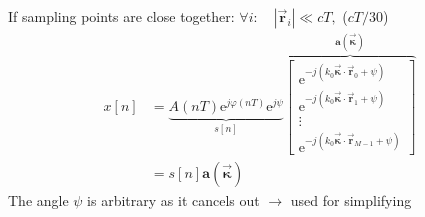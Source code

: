 \documentclass[english]{latex4ei/latex4ei_sheet}
\begin{document}
\begin{sectionbox}
If sampling points are close together: $\forall i: \quad\left|\overrightarrow{\boldsymbol{r}}_{i}\right| \ll c T,$ ($cT/30$)\vspace{-0.1cm}
$$\begin{aligned}x[n]&=\underbrace{A(n T) \mathrm{e}^{j \varphi(n T)} \mathrm{e}^{j \psi}}_{s[n]} \overbrace{\left[\begin{array}{l}
  \mathrm{e}^{-j\left(k_{0} \overrightarrow{\boldsymbol{\kappa}} \cdot \overrightarrow{\boldsymbol{r}}_{0}+\psi\right)} \\
  \mathrm{e}^{-j\left(k_{0} \overrightarrow{\boldsymbol{\kappa}} \cdot \overrightarrow{\boldsymbol{r}}_{1}+\psi\right)} \\
  \vdots \\
  \mathrm{e}^{-j\left(k_{0} \overrightarrow{\boldsymbol{\kappa}} \cdot \overrightarrow{\boldsymbol{r}}_{M-1}+\psi\right)}
  \end{array}\right]}^{\boldsymbol{a}(\overrightarrow{\boldsymbol{\kappa}})}\\&=s[n] \boldsymbol{a}(\overrightarrow{\boldsymbol{\kappa}})\end{aligned}$$
  The angle $\psi$ is arbitrary as it cancels out $\rightarrow$ used for simplifying
\end{sectionbox}
\end{document}
